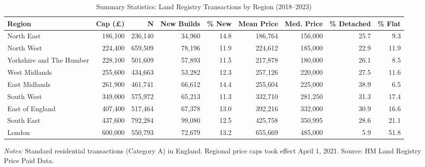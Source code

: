\begin{table}[htbp]
\centering
\caption{Summary Statistics: Land Registry Transactions by Region (2018--2023)}
\label{tab:summary}
\begin{adjustbox}{max width=\textwidth}
\begin{tabular}{lrrrrrrrr}
\hline\hline
Region & Cap (\pounds) & N & New Builds & \% New & Mean Price & Med. Price & \% Detached & \% Flat \\
\hline
North East & 186,100 & 236,140 & 34,960 & 14.8 & 186,764 & 156,000 & 25.7 & 9.3 \\
North West & 224,400 & 659,509 & 78,196 & 11.9 & 224,612 & 185,000 & 22.9 & 11.9 \\
Yorkshire and The Humber & 228,100 & 501,609 & 57,893 & 11.5 & 217,878 & 180,000 & 26.1 & 8.5 \\
West Midlands & 255,600 & 434,663 & 53,282 & 12.3 & 257,126 & 220,000 & 27.5 & 11.6 \\
East Midlands & 261,900 & 461,741 & 66,612 & 14.4 & 255,604 & 225,000 & 38.9 & 6.5 \\
South West & 349,000 & 575,972 & 65,213 & 11.3 & 332,710 & 281,250 & 31.3 & 17.4 \\
East of England & 407,400 & 517,464 & 67,378 & 13.0 & 392,216 & 332,000 & 30.9 & 16.6 \\
South East & 437,600 & 792,284 & 99,080 & 12.5 & 425,758 & 350,995 & 28.6 & 21.1 \\
London & 600,000 & 550,793 & 72,679 & 13.2 & 655,669 & 485,000 & 5.9 & 51.8 \\
\hline\hline
\end{tabular}
\end{adjustbox}
\begin{minipage}{\textwidth}
\footnotesize \textit{Notes:} Standard residential transactions (Category A) in England. Regional price caps took effect April 1, 2021. Source: HM Land Registry Price Paid Data.
\end{minipage}
\end{table}
